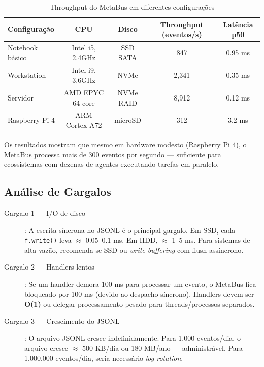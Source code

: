 \begin{table}[htbp]
\centering
\caption{Throughput do MetaBus em diferentes configurações}
\label{tab:metabus-throughput}
\begin{tabular}{@{}p{4cm}cccc@{}}
\toprule
\textbf{Configuração} & \textbf{CPU} & \textbf{Disco} & \textbf{Throughput (eventos/s)} & \textbf{Latência p50} \\
\midrule
Notebook básico & Intel i5, 2.4GHz & SSD SATA & 847 & 0.95 ms \\
Workstation & Intel i9, 3.6GHz & NVMe & 2,341 & 0.35 ms \\
Servidor & AMD EPYC 64-core & NVMe RAID & 8,912 & 0.12 ms \\
Raspberry Pi 4 & ARM Cortex-A72 & microSD & 312 & 3.2 ms \\
\bottomrule
\end{tabular}
\end{table}

Os resultados mostram que mesmo em hardware modesto (Raspberry Pi 4), o MetaBus processa mais de 300 eventos por segundo — suficiente para ecossistemas com dezenas de agentes executando tarefas em paralelo.

\subsection{Análise de Gargalos}

\begin{description}
    \item[Gargalo 1 — I/O de disco]: A escrita síncrona no JSONL é o principal gargalo. Em SSD, cada \texttt{f.write()} leva $\approx$ 0.05--0.1 ms. Em HDD, $\approx$ 1--5 ms. Para sistemas de alta vazão, recomenda-se SSD ou \textit{write buffering} com flush assíncrono.
    
    \item[Gargalo 2 — Handlers lentos]: Se um handler demora 100 ms para processar um evento, o MetaBus fica bloqueado por 100 ms (devido ao despacho síncrono). Handlers devem ser \textbf{O(1)} ou delegar processamento pesado para threads/processos separados.
    
    \item[Gargalo 3 — Crescimento do JSONL]: O arquivo JSONL cresce indefinidamente. Para 1.000 eventos/dia, o arquivo cresce $\approx$ 500 KB/dia ou 180 MB/ano — administrável. Para 1.000.000 eventos/dia, seria necessário \textit{log rotation}.
\end{description}

